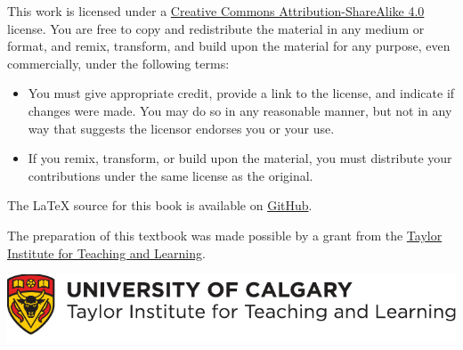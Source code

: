 \bigskip

\noindent This work is licensed under a \href{https://creativecommons.org/licenses/by-sa/4.0/}{Creative Commons Attribution-ShareAlike 4.0} license. 
You are free to copy and redistribute the material in any medium or format, and  remix, transform, and build upon the material for any purpose, even commercially, under the following terms:
\begin{itemize}
\item You must give appropriate credit, provide a link to the license, and indicate if changes were made. You may do so in any reasonable manner, but not in any way that suggests the licensor endorses you or your use.
\item If you remix, transform, or build upon the material, you must distribute your contributions under the same license as the original.
\end{itemize}
The \LaTeX{} source for this book is available on \href{https://github.com/rzach/forallx-yyc/}{GitHub}.

\vfill
\noindent The preparation of this textbook was made possible by a grant from the \href{http://www.ucalgary.ca/taylorinstitute/}{Taylor Institute for Teaching and Learning}.

\bigskip
\noindent
\href{http://www.ucalgary.ca/taylorinstitute/}{\includegraphics{assets/ti-color}}
